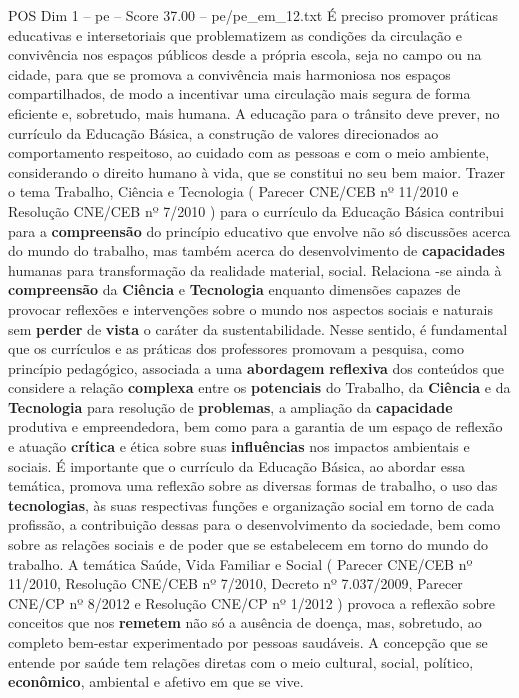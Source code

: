 \begin{textsample}{POS Dim 1 – pe – Score 37.00 – pe/pe\_em\_12.txt}
É preciso promover práticas educativas e intersetoriais que problematizem as condições da circulação e convivência nos espaços públicos desde a própria escola, seja no campo ou na cidade, para que se promova a convivência mais harmoniosa nos espaços compartilhados, de modo a incentivar uma circulação mais segura de forma eficiente e, sobretudo, mais humana.
A educação para o trânsito deve prever, no currículo da Educação Básica, a construção de valores direcionados ao comportamento respeitoso, ao cuidado com as pessoas e com o meio ambiente, considerando o direito humano à vida, que se constitui no seu bem maior.
Trazer o tema Trabalho, Ciência e Tecnologia ( Parecer CNE/CEB nº 11/2010 e Resolução CNE/CEB nº 7/2010 ) para o currículo da Educação Básica contribui para a \textbf{compreensão} do princípio educativo que envolve não só discussões acerca do mundo do trabalho, mas também acerca do desenvolvimento de \textbf{capacidades} humanas para transformação da realidade material, social.
Relaciona -se ainda à \textbf{compreensão} da \textbf{Ciência} e \textbf{Tecnologia} enquanto dimensões capazes de provocar reflexões e intervenções sobre o mundo nos aspectos sociais e naturais sem \textbf{perder} de \textbf{vista} o caráter da sustentabilidade.
Nesse sentido, é fundamental que os currículos e as práticas dos professores promovam a pesquisa, como princípio pedagógico, associada a uma \textbf{abordagem} \textbf{reflexiva} dos conteúdos que considere a relação \textbf{complexa} entre os \textbf{potenciais} do Trabalho, da \textbf{Ciência} e da \textbf{Tecnologia} para resolução de \textbf{problemas}, a ampliação da \textbf{capacidade} produtiva e empreendedora, bem como para a garantia de um espaço de reflexão e atuação \textbf{crítica} e ética sobre suas \textbf{influências} nos impactos ambientais e sociais.
É importante que o currículo da Educação Básica, ao abordar essa temática, promova uma reflexão sobre as diversas formas de trabalho, o uso das \textbf{tecnologias}, às suas respectivas funções e organização social em torno de cada profissão, a contribuição dessas para o desenvolvimento da sociedade, bem como sobre as relações sociais e de poder que se estabelecem em torno do mundo do trabalho.
A temática Saúde, Vida Familiar e Social ( Parecer CNE/CEB nº 11/2010, Resolução CNE/CEB nº 7/2010, Decreto nº 7.037/2009, Parecer CNE/CP nº 8/2012 e Resolução CNE/CP nº 1/2012 ) provoca a reflexão sobre conceitos que nos \textbf{remetem} não só a ausência de doença, mas, sobretudo, ao completo bem-estar experimentado por pessoas saudáveis.
A concepção que se entende por saúde tem relações diretas com o meio cultural, social, político, \textbf{econômico}, ambiental e afetivo em que se vive.

\end{textsample}

